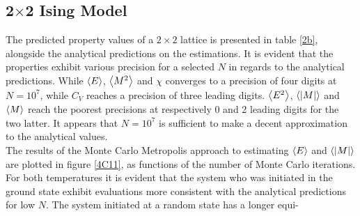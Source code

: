 \documentclass[%
reprint,nofootinbib,
amsmath,amssymb,
aps,
]{revtex4-1}
\begin{document}
\subsection*{2$\times$2 Ising Model}\noindent 
The predicted property values of a $2\times 2$ lattice is presented in table \ref{2b}, alongside the analytical predictions on the estimations. It is evident that the properties exhibit various precision for a selected $N$ in regards to the analytical predictions. While $\expval{E}$, $\expval{M^2}$ and $\chi$ converges to a precision of four digits at $N=10^7$, while $C_V$ reaches a precision of three leading digits. $\expval{E^2}$, $\expval{\abs{M}}$ and  $\expval{M} $ reach the poorest precisions at respectively 0 and 2 leading digits for the two latter. It appears that $N=10^7$ is sufficient to make a decent approximation to the analytical values. \\ \indent 
The results of the Monte Carlo Metropolis approach to estimating $\expval{E}$ and $\expval{\abs{M}}$ are plotted in figure \ref{4C11}, as functions of the number of Monte Carlo iterations. For both temperatures it is evident that the system who was initiated in the ground state exhibit evaluations more consistent with the analytical predictions for low $N$. The system initiated at a random state has a longer equi-\\ \vspace{10mm} 
\end{document}
